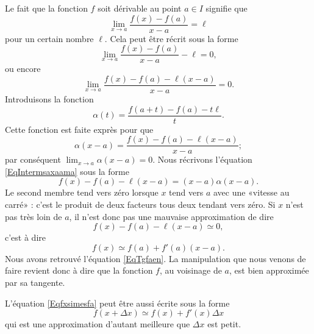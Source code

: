 Le fait que la fonction $f$ soit dérivable au point $a\in I$ signifie que
\begin{equation}
	\lim_{x\to a} \frac{ f(x)-f(a) }{ x-a }=\ell
\end{equation}
pour un certain nombre $\ell$. Cela peut être récrit sous la forme
\begin{equation}
	\lim_{x\to a} \frac{ f(x)-f(a) }{ x-a }-\ell=0,
\end{equation}
ou encore
\begin{equation}
	\lim_{x\to a} \frac{ f(x)-f(a)-\ell(x-a) }{ x-a }=0.
\end{equation}
Introduisons la fonction
\begin{equation}
	\alpha(t)=\frac{ f(a+t)-f(a)-t\ell }{ t }.
\end{equation}
Cette fonction est faite exprès pour que
\begin{equation}		\label{EqIntermsaxaama}
	\alpha(x-a)=\frac{ f(x)-f(a)-\ell(x-a) }{ x-a };
\end{equation}
par conséquent $\lim_{x\to a} \alpha(x-a)=0$. Nous récrivons l'équation \eqref{EqIntermsaxaama} sous la forme
\begin{equation}        \label{EqCodeDerviffxam}
	f(x)-f(a)-\ell(x-a)=(x-a)\alpha(x-a).
\end{equation}
Le second membre tend vers zéro lorsque $x$ tend vers $a$ avec une «vitesse au carré» : c'est le produit de deux facteurs tous deux tendant vers zéro. Si $x$ n'est pas très loin de $a$, il n'est donc pas une mauvaise approximation de dire
\begin{equation}
	f(x)-f(a)-\ell(x-a)\simeq 0,
\end{equation}
c'est à dire
\begin{equation}		\label{Eqfxsimesfa}
	f(x)\simeq f(a)+f'(a)(x-a).
\end{equation}
Nous avons retrouvé l'équation \eqref{EqTgfaen}. La manipulation que nous venons de faire revient donc à dire que la fonction $f$, au voisinage de $a$, est bien approximée par sa tangente.

L'équation \eqref{Eqfxsimesfa} peut être aussi écrite sous la forme
\begin{equation}		\label{EqfxdxSimeqfxfpx}
	f(x+\Delta x)\simeq f(x)+f'(x)\Delta x
\end{equation}
qui est une approximation d'autant meilleure que $\Delta x$ est petit.

